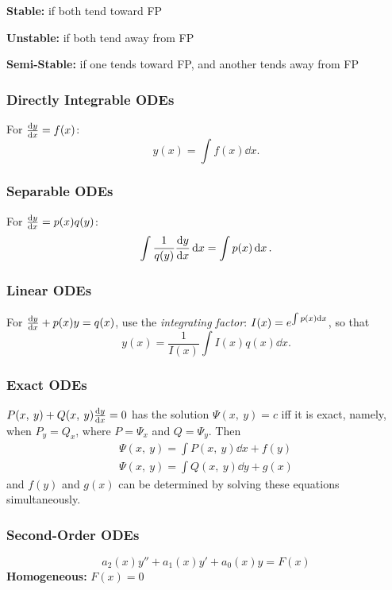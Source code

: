 \documentclass{article}
\begin{document}
\begin{multicols}{3}
    \textbf{Stable:} if both tend toward FP

    \textbf{Unstable:} if both tend away from FP

    \textbf{Semi-Stable:} if one tends toward FP, and another tends away from FP
    \subsubsection*{Directly Integrable ODEs}
    For $\dv{y}{x} = f(x)$:
    \begin{equation*}
        y(x) = \int f(x) \dd{x}.
    \end{equation*}
    \subsubsection*{Separable ODEs}
    For $\dv{y}{x} = p(x) q(y)$:
    \begin{equation*}
        \int \frac{1}{q(y)} \dv{y}{x} \dd{x} = \int p(x) \dd{x}.
    \end{equation*}
    \subsubsection*{Linear ODEs}
    For $\dv{y}{x} + p(x)y = q(x)$, use the \textit{integrating factor}:
    $I(x) = e^{\int p(x) \dd{x}}$, so that
    \begin{equation*}
        y(x) = \frac{1}{I(x)} \int I(x) q(x) \dd{x}.
    \end{equation*}
    \subsubsection*{Exact ODEs}
    $P(x,\: y) + Q(x,\: y)\dv{y}{x} = 0$
    has the solution
    $\Psi(x,\: y) = c$
    iff it is exact, namely, when
    $P_y = Q_x$,
    where $P = \Psi_x$ and $Q = \Psi_y$. Then
    \begin{gather*}
        \Psi(x,\: y) = \int P(x,\: y) \dd{x} + f(y) \\
        \Psi(x,\: y) = \int Q(x,\: y) \dd{y} + g(x)
    \end{gather*}
    and $f(y)$ and $g(x)$ can be determined by solving these equations simultaneously.
    \subsubsection*{Second-Order ODEs}
    \begin{equation*}
        a_2(x)y'' + a_1(x)y' + a_0(x)y = F(x)
    \end{equation*}
    \textbf{Homogeneous:} $F(x) = 0$


\end{multicols}
\end{document}
